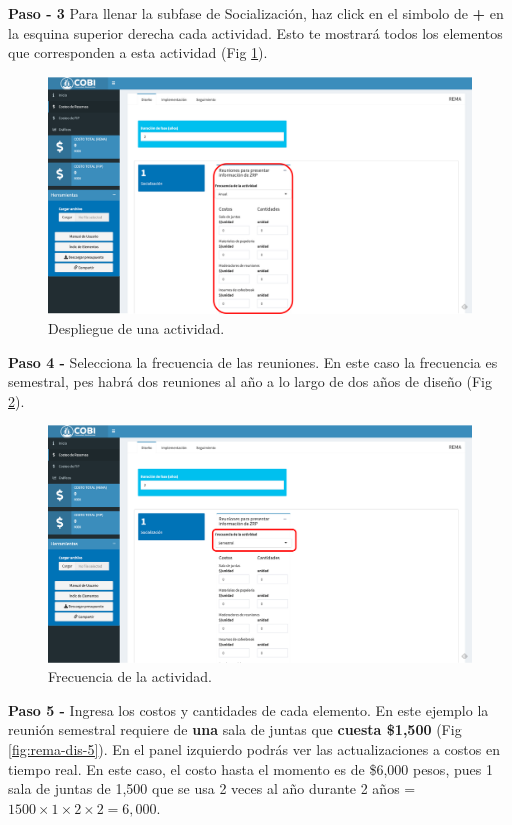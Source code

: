 \documentclass[
]{book}
\begin{document}
\textbf{Paso - 3 } Para llenar la subfase de Socialización, haz click en el simbolo de \textbf{+} en la esquina superior derecha cada actividad. Esto te mostrará todos los elementos que corresponden a esta actividad (Fig \ref{fig:rem-dis-3}).

\begin{figure}
\centering
\includegraphics{images/rema_dis_3.png}
\caption{\label{fig:rem-dis-3}Despliegue de una actividad.}
\end{figure}

\textbf{Paso 4 - } Selecciona la frecuencia de las reuniones. En este caso la frecuencia es semestral, pes habrá dos reuniones al año a lo largo de dos años de diseño (Fig \ref{fig:rem-dis-4}).

\begin{figure}
\centering
\includegraphics{images/rema_dis_4.png}
\caption{\label{fig:rem-dis-4}Frecuencia de la actividad.}
\end{figure}

\textbf{Paso 5 - } Ingresa los costos y cantidades de cada elemento. En este ejemplo la reunión semestral requiere de \textbf{una} sala de juntas que \textbf{cuesta \$1,500} (Fig \ref{fig:rema-dis-5}). En el panel izquierdo podrás ver las actualizaciones a costos en tiempo real. En este caso, el costo hasta el momento es de \$6,000 pesos, pues 1 sala de juntas de 1,500 que se usa 2 veces al año durante 2 años = \(1500 \times 1 \times 2 \times 2 = 6,000\).
\end{document}
